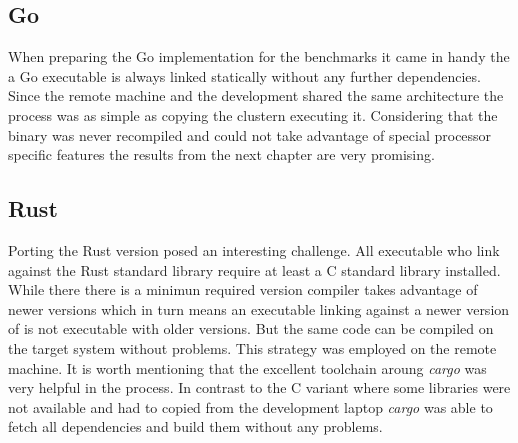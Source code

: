 \subsection*{Go}
\label{subsec:Implementation::ClusterPreparation::Go}

When preparing the Go implementation for the benchmarks it came in handy the a Go executable is always linked statically without any further dependencies. Since the remote machine and the development shared the same architecture the process was as simple as copying the clustern executing it. Considering that the binary was never recompiled and could not take advantage of special processor specific features the results from the next chapter are very promising.

\subsection*{Rust}
\label{subsec:Implementation::ClusterPreparation::Rust}

Porting the Rust version posed an interesting challenge. All executable who link against the Rust standard library require at least a C standard library installed. While there there is a minimun required version compiler takes advantage of newer versions which in turn means an executable linking against a newer version of  is not executable with older versions. But the same code can be compiled on the target system without problems. This strategy was employed on the remote machine. It is worth mentioning that the excellent toolchain aroung \textit{cargo} was very helpful in the process. In contrast to the C variant where some libraries were not available and had to copied from the development laptop \textit{cargo} was able to fetch all dependencies and build them without any problems.
